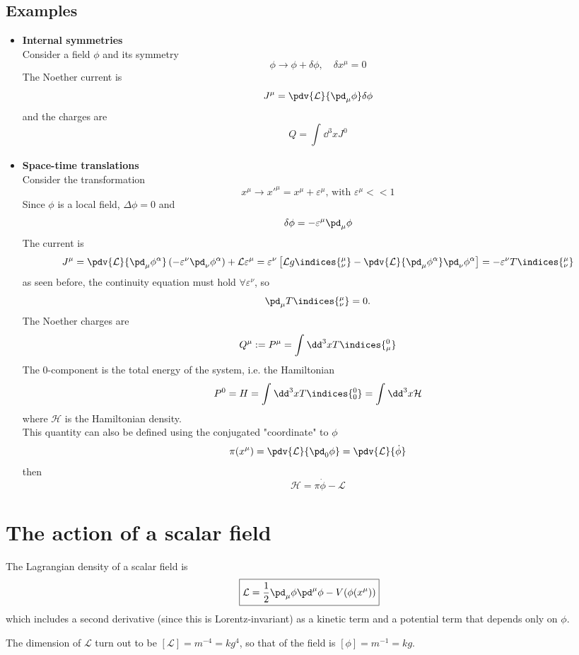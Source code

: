 \subsection{Examples}
\begin{itemize}
    \item \textbf{Internal symmetries}\\
Consider a field $\phi$ and its symmetry
$$\phi\rightarrow\phi+\delta\phi,\quad\delta x^\mu=0$$
The Noether current is
$$J^\mu=\pdv{\mathcal{L}}{\pd_\mu\phi}\delta\phi$$
and the charges are
$$Q = \int_{}^{}\dd^3 x J^0$$
\item \textbf{Space-time translations}\\
    Consider the transformation
$$x^\mu\rightarrow x'^\mu = x^\mu+\varepsilon^\mu\text{, with }\varepsilon^\mu<<1$$
Since $\phi$ is a local field, $\Delta\phi= 0$ and
$$\delta\phi = -\varepsilon^\mu\pd_\mu\phi$$
The current is
$$J^\mu = \pdv{\mathcal{L}}{\pd_\mu\phi^\alpha}\left(-\varepsilon^\nu\pd_\nu
\phi^\alpha\right) + \mathcal{L}\varepsilon^\mu = \varepsilon^\nu\left[\mathcal{L}
g\indices{^\mu_\nu}-\pdv{\mathcal{L}}{\pd_\mu\phi^\alpha}\pd_\nu\phi^\alpha\right]=
-\varepsilon^\nu T\indices{^\mu_\nu}$$
as seen before, the continuity equation must hold $\forall \varepsilon^\nu$, so
$$\pd_\mu T\indices{^\mu_\nu} = 0.$$
The Noether charges are
$$Q^\mu:=P^\mu = \int_{}^{}\dd^3 x T\indices{^0_\mu}$$
The 0-component is the total energy of the system, i.e. the Hamiltonian
$$P^0 = H = \int_{}^{}\dd^3x T\indices{^0_0} = \int_{}^{}\dd^3x\mathcal{H}$$
where $\mathcal{H}$ is the Hamiltonian density.\\
This quantity can also be defined using the conjugated "coordinate" to $\phi$
$$\pi(x^\mu) = \pdv{\mathcal{L}}{\pd_0\phi} = \pdv{\mathcal{L}}{\dot \phi}$$
then
$$\mathcal{H} = \pi\dot\phi-\mathcal{L}$$
\end{itemize}
\section{The action of a scalar field}
The Lagrangian density of a scalar field is
$$\boxed{\mathcal{L} = \frac{1}{2}\pd_\mu\phi\pd^\mu\phi - V(\phi(x^\mu))}$$
which includes a second derivative (since this is Lorentz-invariant) as a kinetic
term and a potential term that depends only on $\phi$.

The dimension of $\mathcal{L}$ turn out to be $[\mathcal{L}] = m^{-4}=kg^4$, so
that of the field is $[\phi] = m^{-1} = kg$.

